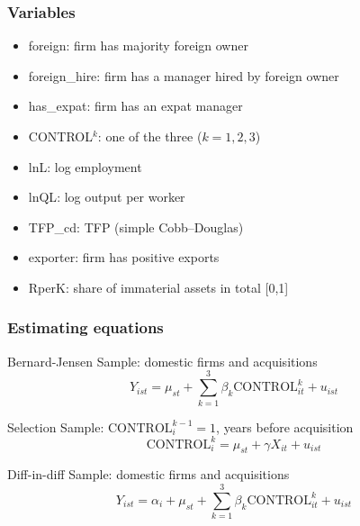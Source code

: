 \documentclass[aspectratio=43,compress,mathserif]{beamer}
\begin{document}
\begin{frame}\frametitle{Variables}\hypertarget{Variables}{}
\begin{itemize}
\item \alert{foreign}: firm has majority foreign owner

\item \alert{foreign\_hire}: firm has a manager hired by foreign owner

\item \alert{has\_expat}: firm has an expat manager

\item \alert{CONTROL${}^k$}: one of the three ($k=1,2,3$)

\item \alert{lnL}: log employment

\item \alert{lnQL}: log output per worker

\item \alert{TFP\_cd}: TFP (simple Cobb--Douglas)

\item \alert{exporter}: firm has positive exports

\item \alert{RperK}: share of immaterial assets in total [0,1]




\end{itemize}
\end{frame}



\begin{frame}\frametitle{Estimating equations}\hypertarget{Estimating equations}{}
\begin{block}{Bernard-Jensen}\hypertarget{Bernard-Jensen}{}
Sample: domestic firms and acquisitions
$$
Y_{ist} = \mu_{st} + \sum_{k=1}^3 \beta_k \text{CONTROL}_{it}^k + u_{ist}
$$


\end{block}
\begin{block}{Selection}\hypertarget{Selection}{}
Sample: $\text{CONTROL}_{i}^{k-1} = 1$, years before acquisition
$$
\text{CONTROL}_{i}^k = \mu_{st} + \gamma X_{it}  + u_{ist}
$$


\end{block}
\begin{block}{Diff-in-diff}\hypertarget{Diff-in-diff}{}
Sample: domestic firms and acquisitions
$$
Y_{ist} = \alpha_i + \mu_{st} + \sum_{k=1}^3 \beta_k \text{CONTROL}_{it}^k + u_{ist}
$$


\end{block}
\end{frame}
\end{document}
